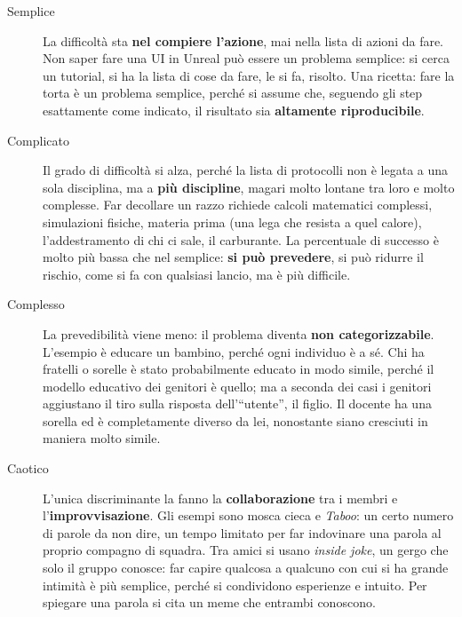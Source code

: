 \begin{description}
  \item[Semplice] La difficoltà sta \textbf{nel compiere l'azione}, mai nella
        lista di azioni da fare. Non saper fare una UI in Unreal può essere un
        problema semplice: si cerca un tutorial, si ha la lista di cose da
        fare, le si fa, risolto. Una ricetta: fare la torta è un problema
        semplice, perché si assume che, seguendo gli step esattamente come
        indicato, il risultato sia \textbf{altamente riproducibile}.
  \item[Complicato] Il grado di difficoltà si alza, perché la lista di
        protocolli non è legata a una sola disciplina, ma a \textbf{più
        discipline}, magari molto lontane tra loro e molto complesse. Far
        decollare un razzo richiede calcoli matematici complessi, simulazioni
        fisiche, materia prima (una lega che resista a quel calore),
        l'addestramento di chi ci sale, il carburante. La percentuale di
        successo è molto più bassa che nel semplice: \textbf{si può
        prevedere}, si può ridurre il rischio, come si fa con qualsiasi lancio,
        ma è più difficile.
  \item[Complesso] La prevedibilità viene meno: il problema diventa
        \textbf{non categorizzabile}. L'esempio è educare un bambino, perché
        ogni individuo è a sé. Chi ha fratelli o sorelle è stato
        probabilmente educato in modo simile, perché il modello educativo dei
        genitori è quello; ma a seconda dei casi i genitori aggiustano il
        tiro sulla risposta dell'``utente'', il figlio. Il docente ha una
        sorella ed è completamente diverso da lei, nonostante siano cresciuti
        in maniera molto simile.
  \item[Caotico] L'unica discriminante la fanno la \textbf{collaborazione}
        tra i membri e l'\textbf{improvvisazione}. Gli esempi sono mosca cieca
        e \emph{Taboo}: un certo numero di parole da non dire, un tempo
        limitato per far indovinare una parola al proprio compagno di squadra.
        Tra amici si usano \emph{inside joke}, un gergo che solo il gruppo
        conosce: far capire qualcosa a qualcuno con cui si ha grande intimità è
        più semplice, perché si condividono esperienze e intuito. Per spiegare
        una parola si cita un meme che entrambi conoscono.
\end{description}

